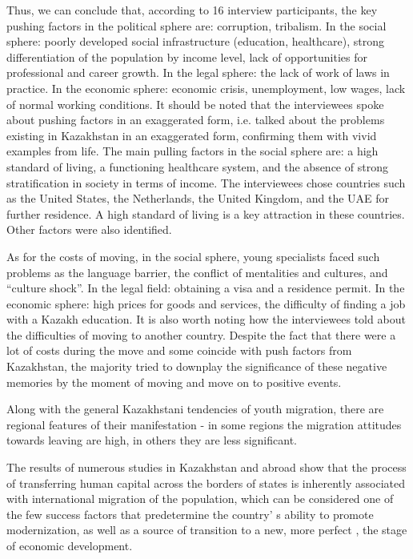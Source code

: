 {Thus, we can conclude that, according to 16 interview participants, the
key pushing factors in the political sphere are: corruption, tribalism.
In the social sphere: poorly developed social infrastructure (education,
healthcare), strong differentiation of the population by income level,
lack of opportunities for professional and career growth. In the legal
sphere: the lack of work of laws in practice. In the economic sphere:
economic crisis, unemployment, low wages, lack of normal working
conditions. It should be noted that the interviewees spoke about pushing
factors in an exaggerated form, i.e. talked about the problems existing
in Kazakhstan in an exaggerated form, confirming them with vivid
examples from life. The main pulling factors in the social sphere are: a
high standard of living, a functioning healthcare system, and the
absence of strong stratification in society in terms of income. The
interviewees chose countries such as the United States, the Netherlands,
the United Kingdom, and the UAE for further residence. A high standard
of living is a key attraction in these countries. Other factors were
also identified.

As for the costs of moving, in the social sphere, young specialists
faced such problems as the language barrier, the conflict of mentalities
and cultures, and ``culture shock''. In the legal field: obtaining a
visa and a residence permit. In the economic sphere: high prices for
goods and services, the difficulty of finding a job with a Kazakh
education. It is also worth noting how the interviewees told about the
difficulties of moving to another country. Despite the fact that there
were a lot of costs during the move and some coincide with push factors
from Kazakhstan, the majority tried to downplay the significance of
these negative memories by the moment of moving and move on to positive
events.

Along with the general Kazakhstani tendencies of youth migration, there
are regional features of their manifestation - in some regions the
migration attitudes towards leaving are high, in others they are less
significant.

The results of numerous studies in Kazakhstan and abroad show that the
process of transferring human capital across the borders of states is
inherently associated with international migration of the population,
which can be considered one of the few success factors that predetermine
the country' s ability to promote modernization, as well
as a source of transition to a new, more perfect , the stage of economic
development.

}
